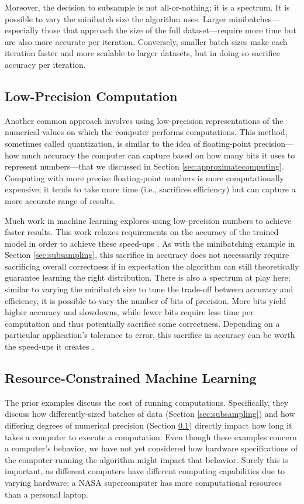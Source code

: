 \documentclass[sigplan,screen]{acmart}
\begin{document}
Moreover, the decision to subsample is not all-or-nothing; it is a spectrum. It is possible to vary the minibatch size the algorithm uses. Larger minibatches---especially those that approach the size of the full dataset---require more time but are also more accurate per iteration. Conversely, smaller batch sizes make each iteration faster and more scalable to larger datasets, but in doing so sacrifice accuracy per iteration.

\subsection{Low-Precision Computation} \label{sec:quantization}
Another common approach involves using low-precision representations of the numerical values on which the computer performs computations. This method, sometimes called quantization, is similar to the idea of floating-point precision---how much accuracy the computer can capture based on how many bits it uses to represent numbers---that we discussed in Section \ref{sec:approximatecomputing}. Computing with more precise floating-point numbers is more computationally expensive; it tends to take more time (i.e., sacrifices efficiency) but can capture a more accurate range of results.

Much work in machine learning explores using low-precision numbers to achieve faster results. This work relaxes requirements on the accuracy of the trained model in order to achieve these speed-ups \cite{desa2017async, gong2014quantize, courbariaux2015binaryconnect, alistarh2017qsgd, gupta2015lowprecision,han2015deep}. As with the minibatching example in Section \ref{sec:subsampling}, this sacrifice in accuracy does not necessarily require sacrificing overall correctness if in expectation the algorithm can still theoretically guarantee learning the right distribution. There is also a spectrum at play here; similar to varying the minibatch size to tune the trade-off between accuracy and efficiency, it is possible to vary the number of bits of precision. More bits yield higher accuracy and slowdowns, while fewer bits require less time per computation and thus potentially sacrifice some correctness. Depending on a particular application's tolerance to error, this sacrifice in accuracy can be worth the speed-ups it creates \cite{desa2018halp}.

\subsection{Resource-Constrained Machine Learning} \label{sec:resources}
The prior examples discuss the cost of running computations. Specifically, they discuss how differently-sized batches of data (Section \ref{sec:subsampling}) and how differing degrees of numerical precision (Section \ref{sec:quantization}) directly impact how long it takes a computer to execute a computation. Even though these examples concern a computer's behavior, we have not yet considered how hardware specifications of the computer running the algorithm might impact that behavior. Surely this is important, as different computers have different computing capabilities due to varying hardware; a NASA supercomputer has more computational resources than a personal laptop.
\end{document}
